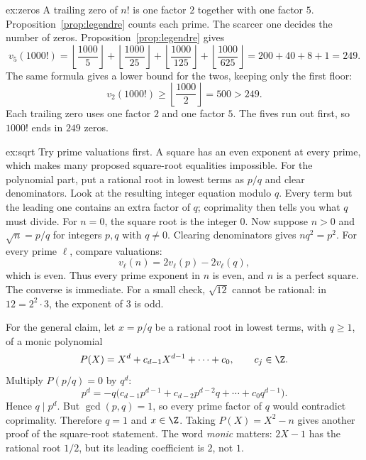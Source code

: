\begin{solution}{ex:zeros}
\idea A trailing zero of $n!$ is one factor $2$ together with one factor $5$. Proposition~\ref{prop:legendre} counts each prime. The scarcer one decides the number of zeros.
\writeup Proposition~\ref{prop:legendre} gives
\[
v_5(1000!)=\left\lfloor\frac{1000}5\right\rfloor
+\left\lfloor\frac{1000}{25}\right\rfloor
+\left\lfloor\frac{1000}{125}\right\rfloor
+\left\lfloor\frac{1000}{625}\right\rfloor
=200+40+8+1=249.
\]
The same formula gives a lower bound for the twos, keeping only the first floor:
\[
v_2(1000!)\ge\left\lfloor\frac{1000}2\right\rfloor=500>249.
\]
Each trailing zero uses one factor $2$ and one factor $5$. The fives run out first, so $1000!$ ends in $249$ zeros.
\end{solution}

\begin{solution}{ex:sqrt}
\idea Try prime valuations first. A square has an even exponent at every prime, which makes many proposed square-root equalities impossible. For the polynomial part, put a rational root in lowest terms as $p/q$ and clear denominators. Look at the resulting integer equation modulo $q$. Every term but the leading one contains an extra factor of $q$; coprimality then tells you what $q$ must divide.
\writeup For $n=0$, the square root is the integer $0$. Now suppose $n>0$ and $\sqrt n=p/q$ for integers $p,q$ with $q\ne0$. Clearing denominators gives $nq^2=p^2$. For every prime $\ell$, compare valuations:
\[
v_\ell(n)=2v_\ell(p)-2v_\ell(q),
\]
which is even. Thus every prime exponent in $n$ is even, and $n$ is a perfect square. The converse is immediate. For a small check, $\sqrt{12}$ cannot be rational: in $12=2^2\cdot3$, the exponent of $3$ is odd.

For the general claim, let $x=p/q$ be a rational root in lowest terms, with $q\ge1$, of a monic polynomial
\[
P(X)=X^d+c_{d-1}X^{d-1}+\cdots+c_0,\qquad c_j\in\Z.
\]
Multiply $P(p/q)=0$ by $q^d$:
\[
p^d=-q\bigl(c_{d-1}p^{d-1}
+c_{d-2}p^{d-2}q+\cdots+c_0q^{d-1}\bigr).
\]
Hence $q\mid p^d$. But $\gcd(p,q)=1$, so every prime factor of $q$ would contradict coprimality. Therefore $q=1$ and $x\in\Z$. Taking $P(X)=X^2-n$ gives another proof of the square-root statement. The word \emph{monic} matters: $2X-1$ has the rational root $1/2$, but its leading coefficient is $2$, not $1$.
\end{solution}

